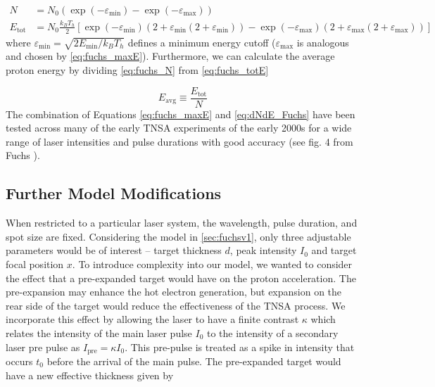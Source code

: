 \begin{align}
	N &= N_0 (\exp(-\varepsilon_\text{min}) - \exp(-\varepsilon_\text{max})) \label{eq:fuchs_N} \\
	E_\text{tot} &= N_0 \frac{k_B T_h}{2}[\exp(-\varepsilon_\text{min})(2 + \varepsilon_\text{min}(2 + \varepsilon_\text{min})) - \exp(-\varepsilon_\text{max})(2 + \varepsilon_\text{max}(2 + \varepsilon_\text{max}))] \label{eq:fuchs_totE}
\end{align}
where $\varepsilon_\text{min} = \sqrt{2 E_\text{min} / k_B T_h}$ defines a minimum energy cutoff ($\varepsilon_\text{max}$ is analogous and chosen by \autoref{eq:fuchs_maxE}). Furthermore, we can calculate the average proton energy by dividing \autoref{eq:fuchs_N} from \autoref{eq:fuchs_totE}

\begin{equation}
	E_\text{avg} \equiv \frac{E_\text{tot}}{N} \label{eq:fuchs_avgE}
\end{equation}
The combination of Equations \ref{eq:fuchs_maxE} and \ref{eq:dNdE_Fuchs} have been tested across many of the early \gls{TNSA} experiments of the early 2000s for a wide range of laser intensities and pulse durations with good accuracy (see fig. 4 from Fuchs \cite{Fuchs_2005_Nat}).

\subsection{Further Model Modifications} \label{sec:fuchsv2}
When restricted to a particular laser system, the wavelength, pulse duration, and spot size are fixed. Considering the model in \autoref{sec:fuchsv1}, only three adjustable parameters would be of interest -- target thickness $d$, peak intensity $I_0$ and target focal position $x$. To introduce complexity into our model, we wanted to consider the effect that a pre-expanded target would have on the proton acceleration. The pre-expansion may enhance the hot electron generation, but expansion on the rear side of the target would reduce the effectiveness of the \gls{TNSA} process. We incorporate this effect by allowing the laser to have a finite contrast $\kappa$ which relates the intensity of the main laser pulse $I_0$ to the intensity of a secondary laser pre pulse as $I_\text{pre} = \kappa I_0$. This pre-pulse is treated as a spike in intensity that occurs $t_0$ before the arrival of the main pulse. The pre-expanded target would have a new effective thickness given by 

